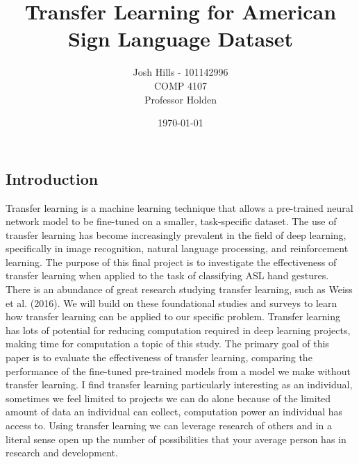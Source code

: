 \documentclass[12pt]{article}
\title{Transfer Learning for American Sign Language Dataset}
\author{Josh Hills - 101142996\\COMP 4107\\Professor Holden}
\date{\today}
\begin{document}
\maketitle
\newpage
\subsection*{Introduction}
\quad
Transfer learning is a machine learning technique that allows a pre-trained neural network model to be fine-tuned on a smaller, task-specific dataset. The use of transfer learning has become 
increasingly prevalent in the field of deep learning, specifically in image recognition, natural language processing, and reinforcement learning. The purpose of this final project is to investigate
the effectiveness of transfer learning when applied to the task of classifying ASL hand gestures. There is an abundance of great research studying transfer learning, such as Weiss et al. (2016). We will
build on these foundational studies and surveys to learn how transfer learning can be applied to our specific problem. Transfer learning has lots of potential for reducing computation required in
deep learning projects, making time for computation a topic of this study. The primary goal of this paper is to evaluate the effectiveness of transfer learning, comparing the performance of the fine-tuned
pre-trained models from a model we make without transfer learning. I find transfer learning particularly interesting as an individual, sometimes we feel limited to projects we can do alone because of the 
limited amount of data an individual can collect, computation power an individual has access to. Using transfer learning we can leverage research of others and in a literal sense 
open up the number of possibilities that your average person has in research and development. 
\end{document}
